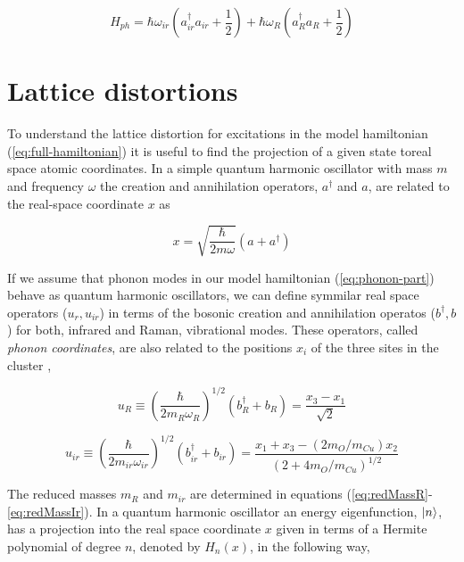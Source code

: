 \begin{equation}\label{eq:phononic-part-complete}
H_{ph} = \hbar \omega_{ir} \left( a_{ir}^\dagger a_{ir} + \frac{1}{2}\right) + \hbar \omega_R\left( a_R^\dagger a_R + \frac{1}{2} \right)
\end{equation}


\section{Lattice distortions}

To understand the lattice distortion for excitations in the model hamiltonian (\ref{eq:full-hamiltonian}) it is useful to find the projection of a given state toreal space atomic coordinates. 
In a simple quantum harmonic oscillator with mass $m$ and frequency $\omega$ the creation and annihilation operators, $a^\dagger$ and $a$, are related to the real-space coordinate $x$ as

\begin{equation}\label{eq:harmOscRel}
x=\sqrt{\frac{\hbar}{2m\omega}}\left(a+a^\dagger\right)
\end{equation}

If we assume that phonon modes in our model hamiltonian (\ref{eq:phonon-part}) behave as quantum harmonic oscillators, we can define symmilar real space operators ($u_r,u_{ir}$) in terms of the bosonic creation and annihilation operatos ($b^\dagger,b$) for both, infrared and Raman, vibrational modes. 
These operators, called \textit{phonon coordinates}, are also related to the positions $x_i$ of the three sites in the cluster \cite{MustredeLeon1992},

\begin{equation}\label{eq:uR}
u_R \equiv \left(\frac{\hbar}{2 m_R \omega_R}\right)^{1/2}(b_R^\dagger + b_R) = \frac{x_3 - x_1}{\sqrt{2}}
\end{equation}

\begin{equation}\label{eq:uir}
u_{ir} \equiv \left(\frac{\hbar}{2 m_{ir} \omega_{ir}}\right)^{1/2}(b^\dagger_{ir}+b_{ir}) = \frac{ x_1 + x_3 - ( 2 m_O/m_{Cu})x_2}{(2 + 4 m_O/m_{Cu})^{1/2}}
\end{equation}

The reduced masses $m_R$ and $m_{ir}$ are determined in equations (\ref{eq:redMassR}-\ref{eq:redMassIr}).
In a quantum harmonic oscillator an energy eigenfunction, $\left | n \right\rangle$, has a projection into the real space coordinate $x$ given in terms of a Hermite polynomial of degree $n$, denoted by $H_n(x)$, in the following way,

